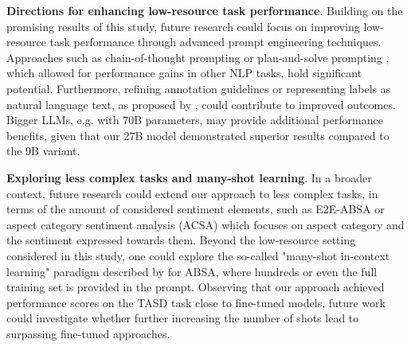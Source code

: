\textbf{Directions for enhancing low-resource task performance}. Building on the promising results of this study, future research could focus on improving low-resource task performance through advanced prompt engineering techniques. Approaches such as chain-of-thought prompting \citep{wei2022chain} or plan-and-solve prompting \citep{wang2023plan}, which allowed for performance gains in other NLP tasks, hold significant potential. Furthermore, refining annotation guidelines or representing labels as natural language text, as proposed by \citet{zhang2021towards}, could contribute to improved outcomes. Bigger LLMs, e.g. with 70B parameters, may provide additional performance benefits, given that our 27B model demonstrated superior results compared to the 9B variant.


\textbf{Exploring less complex tasks and many-shot learning}. In a broader context, future research could extend our approach to less complex tasks, in terms of the amount of considered sentiment elements, such as E2E-ABSA or aspect category sentiment analysis (ACSA) which focuses on aspect category and the sentiment expressed towards them. Beyond the low-resource setting considered in this study, one could explore the so-called "many-shot in-context learning" paradigm described by \citet{agarwal2024many} for ABSA, where hundreds or even the full training set is provided in the prompt. Observing that our approach achieved performance scores on the TASD task close to fine-tuned models, future work could investigate whether further increasing the number of shots lead to surpassing fine-tuned approaches.
